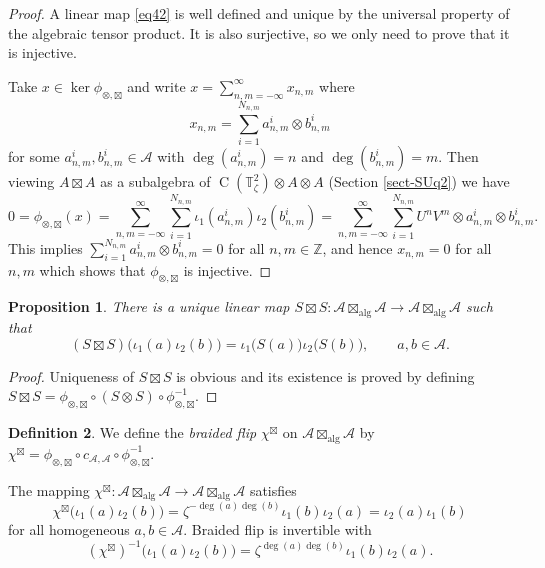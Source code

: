 \documentclass[12pt,reqno,a4paper]{amsart}
\newtheorem{proposition}{Proposition}[section]
\theoremstyle{definition}
\newtheorem{definition}[proposition]{Definition}
\newcommand{\comp}{\circ}
\newcommand{\tens}{\otimes}
\newcommand{\algboxtimes}{\boxtimes_{\textrm{alg}}}
\newcommand{\TT}{\mathbb{T}}
\newcommand{\ZZ}{\mathbb{Z}}
\newcommand{\cA}{\mathscr{A}}
\DeclareMathOperator{\C}{C}
\numberwithin{equation}{section}
\begin{document}
\begin{proof}
A linear map \eqref{eq42} is well defined and unique by the universal property of the algebraic tensor product. It is also surjective, so we only need to prove that it is injective.

Take $x\in\ker{\phi_{\tens,\boxtimes}}$ and write $x=\sum\limits_{n,m=-\infty}^{\infty} x_{n,m}$ where
\[
x_{n,m}=\sum_{i=1}^{N_{n,m}}a_{n,m}^i\tens b_{n,m}^i
\]
for some $a_{n,m}^i,b_{n,m}^i\in\cA$ with $\deg(a_{n,m}^i)=n$ and $\deg(b_{n,m}^i)=m$.
Then viewing $A\boxtimes A$ as a subalgebra of $\C(\TT^2_\zeta)\tens A\tens A$ (Section \ref{sect-SUq2}) we have
\[
0=\phi_{\tens,\boxtimes}(x)
=\sum_{n,m=-\infty}^{\infty}\sum_{i=1}^{N_{n,m}}\iota_1(a^i_{n,m})\iota_2(b^i_{n,m})
=\sum_{n,m=-\infty}^{\infty}\sum_{i=1}^{N_{n,m}}U^nV^m\tens a^i_{n,m}\tens b^i_{n,m}.
\]
This implies $\sum\limits_{i=1}^{N_{n,m}}a^i_{n,m}\tens b^i_{n,m}=0$ for all $n,m\in\ZZ$, and hence $x_{n,m}=0$ for all $n,m$ which shows that $\phi_{\tens,\boxtimes}$ is injective.
\end{proof}

\begin{proposition}
There is a unique linear map $S\boxtimes S\colon\cA\algboxtimes\cA\to\cA\algboxtimes\cA$ such that
\[
(S\boxtimes S)\bigl(\iota_1(a)\iota_2(b)\bigr)
=\iota_1\bigl(S(a)\bigr)\iota_2\bigl(S(b)\bigr),\qquad a,b\in\cA.
\]
\end{proposition}

\begin{proof}
Uniqueness of $S\boxtimes S$ is obvious and its existence is proved by defining  $S\boxtimes S=\phi_{\tens,\boxtimes}\comp(S\tens S)\comp\phi_{\tens,\boxtimes}^{-1}$.
\end{proof}

\begin{definition}
We define the \emph{braided flip} $\chi^\boxtimes$ on $\cA\algboxtimes\cA$ by $\chi^\boxtimes=\phi_{\tens,\boxtimes}\comp c_{\cA,\cA}\comp\phi_{\tens,\boxtimes}^{-1}$.
\end{definition}

The mapping $\chi^\boxtimes\colon\cA\algboxtimes\cA\to\cA\algboxtimes\cA$ satisfies
\begin{equation}\label{eq1} 
\chi^\boxtimes\bigl(\iota_1(a)\iota_2(b)\bigr)=\zeta^{-\deg(a)\deg(b)}\iota_1(b)\iota_2(a)
=\iota_2(a)\iota_1(b)
\end{equation}
for all homogeneous $a,b\in\cA$. Braided flip is invertible with
\[
(\chi^{\boxtimes})^{-1} \bigl(\iota_1(a)\iota_2(b)\bigr)=\zeta^{\deg(a)\deg(b)}\iota_1(b)\iota_2(a).
\]
\end{document}
